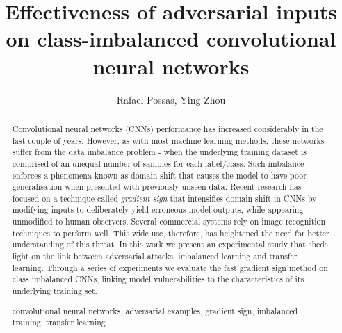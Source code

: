 \documentclass[runningheads,a4paper]{llncs}
\newcommand{\keywords}[1]{\par\addvspace\baselineskip
\noindent\keywordname\enspace\ignorespaces#1}
\begin{document}
\mainmatter  %

\title{Effectiveness of adversarial inputs on class-imbalanced convolutional neural networks}

%
%
\author{Rafael Possas, Ying Zhou}
%


%
%

\maketitle


\begin{abstract}
Convolutional neural networks (CNNs) performance has increased considerably in the last couple of years. However, as with most machine learning methods, these networks suffer from the data imbalance problem - when the underlying training dataset is comprised of an unequal number of samples for each label/class. Such imbalance enforces a phenomena known as domain shift that causes the model to have poor generalisation when presented with previously unseen data. Recent research has focused on a technique called \textit{gradient sign} that intensifies domain shift in CNNs by modifying inputs to deliberately yield erroneous model outputs, while appearing unmodified to human observers. Several commercial systems rely on image recognition techniques to perform well. This wide use, therefore, has heightened the need for better understanding of this threat. In this work we present an experimental study that sheds light on the link between adversarial attacks, imbalanced learning and transfer learning. Through a series of experiments we evaluate the fast gradient sign method on class imbalanced CNNs, linking model vulnerabilities to the characteristics of its underlying training set.
\keywords{convolutional neural networks, adversarial examples, gradient sign, imbalanced training, transfer learning}
\end{abstract}
\end{document}
